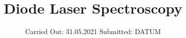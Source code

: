



\subject{V60}  %
\title{Diode Laser Spectroscopy} %
\date{%
  Carried Out: 31.05.2021
  \hspace{3em}
  Submitted: DATUM
}



\maketitle
\thispagestyle{empty}
\tableofcontents
\newpage







\printbibliography{}


